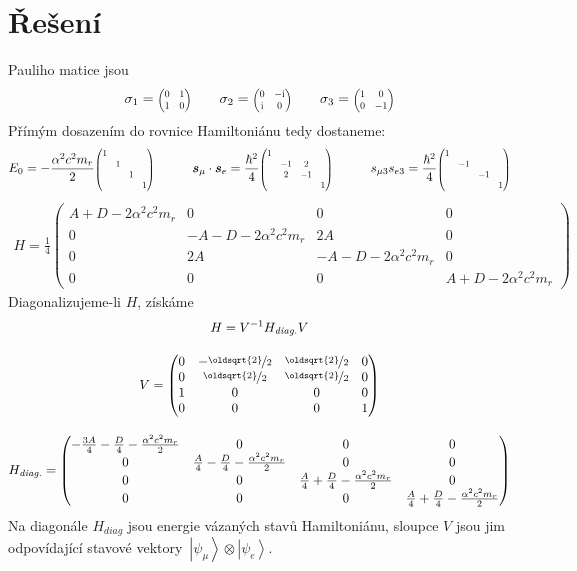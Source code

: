 \documentclass[10pt,a4paper]{article}
\newcommand{\const}[1]{\text{#1}}
\newcommand{\mat}[1]{
    \begin{pmatrix}
        #1
    \end{pmatrix}
}
\newcommand{\smat}[2][1]{
    \scalebox{#1}{$\mat{#2}$}
}
\newcommand{\ket}[1]{\left| #1 \right>}
\renewcommand{\i}{\const{i}}
\begin{document}
\section{Řešení}
Pauliho matice jsou
\begin{align*}
    \sigma_1 = \smat[0.7]{0 & 1\\1 & 0}
    \hspace{2em}
    \sigma_2 = \smat[0.7]{0 & - \i\\\i & 0}
    \hspace{2em}
    \sigma_3 = \smat[0.7]{1 & 0\\0 & -1}
\end{align*}
Přímým dosazením do rovnice Hamiltoniánu tedy dostaneme:
\begin{align*}
    E_0 =
    - \frac{\alpha^{2} c^{2} m_{r}}{2}
    \smat[0.7]{1 \\ & 1 \\ & & 1 \\ & & & 1}
    \hspace{3em}
    \bm{s}_\mu \cdot \bm{s}_e =
    \frac{\hbar^2}{4}
    \smat[0.7]{1 & & & \\ & -1 & 2 & \\ & 2 & -1 & \\ & & & 1}
    \hspace{3em}
    s_{\mu 3} s_{e 3} =
    \frac{\hbar^2}{4}
    \smat[0.7]{1 & & & \\ & -1 &  & \\ &  & -1 & \\ &  &  & 1}
\end{align*}
\begin{align*}
    H = \frac{1}{4}
    \mat{A + D - 2 \alpha^{2} c^{2} m_{r} & 0 & 0 & 0\\0 & - A - D - 2 \alpha^{2} c^{2} m_{r} & 2 A & 0\\0 & 2 A & - A - D - 2 \alpha^{2} c^{2} m_{r} & 0\\0 & 0 & 0 & A + D - 2 \alpha^{2} c^{2} m_{r}}
\end{align*}
Diagonalizujeme-li $H$, získáme
\begin{gather*}
    H = V^{-1} H_\textit{diag.} V
    \\[10pt]
    V = \mat{0 & - \nicefrac{\oldsqrt{2}}{2} & \nicefrac{\oldsqrt{2}}{2} & 0\\0 & \nicefrac{\oldsqrt{2}}{2} & \nicefrac{\oldsqrt{2}}{2} & 0\\1 & 0 & 0 & 0\\0 & 0 & 0 & 1}
    \\[10pt]
    H_\textit{diag.} = \mat{- \frac{3 A}{4} - \frac{D}{4} - \frac{\alpha^{2} c^{2} m_{r}}{2} & 0 & 0 & 0\\0 & \frac{A}{4} - \frac{D}{4} - \frac{\alpha^{2} c^{2} m_{r}}{2} & 0 & 0\\0 & 0 & \frac{A}{4} + \frac{D}{4} - \frac{\alpha^{2} c^{2} m_{r}}{2} & 0\\0 & 0 & 0 & \frac{A}{4} + \frac{D}{4} - \frac{\alpha^{2} c^{2} m_{r}}{2}}
\end{gather*}
Na diagonále $H_\textit{diag}$ jsou energie vázaných stavů Hamiltoniánu, sloupce $V$ jsou jim odpovídající stavové vektory~${\ket{\psi_\mu} \otimes \ket{\psi_e}}$.
\end{document}
